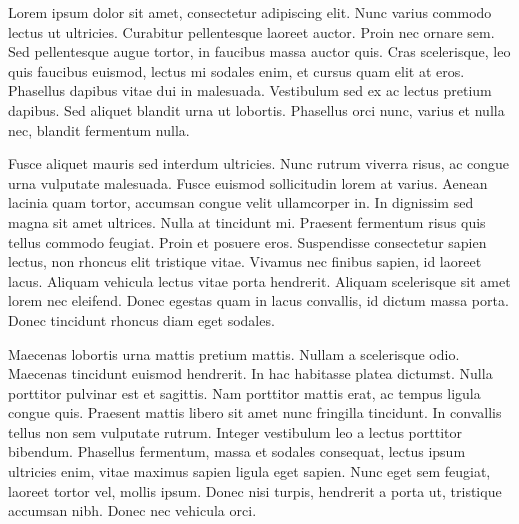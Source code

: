 \documentclass[
11pt, %
english, %
singlespacing, %
headsepline, %
onecolumn
]{MastersDoctoralThesis} %
\begin{document}
\begin{addmargin}[4.2em]{2.5em}
\begin{zusammenfassung}
\addchaptertocentry{\zusammenfassungsname} %


\noindent

Lorem ipsum dolor sit amet, consectetur adipiscing elit. Nunc varius commodo lectus ut ultricies. Curabitur pellentesque laoreet auctor. Proin nec ornare sem. Sed pellentesque augue tortor, in faucibus massa auctor quis. Cras scelerisque, leo quis faucibus euismod, lectus mi sodales enim, et cursus quam elit at eros. Phasellus dapibus vitae dui in malesuada. Vestibulum sed ex ac lectus pretium dapibus. Sed aliquet blandit urna ut lobortis. Phasellus orci nunc, varius et nulla nec, blandit fermentum nulla.

Fusce aliquet mauris sed interdum ultricies. Nunc rutrum viverra risus, ac congue urna vulputate malesuada. Fusce euismod sollicitudin lorem at varius. Aenean lacinia quam tortor, accumsan congue velit ullamcorper in. In dignissim sed magna sit amet ultrices. Nulla at tincidunt mi. Praesent fermentum risus quis tellus commodo feugiat. Proin et posuere eros. Suspendisse consectetur sapien lectus, non rhoncus elit tristique vitae. Vivamus nec finibus sapien, id laoreet lacus. Aliquam vehicula lectus vitae porta hendrerit. Aliquam scelerisque sit amet lorem nec eleifend. Donec egestas quam in lacus convallis, id dictum massa porta. Donec tincidunt rhoncus diam eget sodales.

Maecenas lobortis urna mattis pretium mattis. Nullam a scelerisque odio. Maecenas tincidunt euismod hendrerit. In hac habitasse platea dictumst. Nulla porttitor pulvinar est et sagittis. Nam porttitor mattis erat, ac tempus ligula congue quis. Praesent mattis libero sit amet nunc fringilla tincidunt. In convallis tellus non sem vulputate rutrum. Integer vestibulum leo a lectus porttitor bibendum. Phasellus fermentum, massa et sodales consequat, lectus ipsum ultricies enim, vitae maximus sapien ligula eget sapien. Nunc eget sem feugiat, laoreet tortor vel, mollis ipsum. Donec nisi turpis, hendrerit a porta ut, tristique accumsan nibh. Donec nec vehicula orci.


\end{zusammenfassung}
\end{addmargin}
\end{document}
